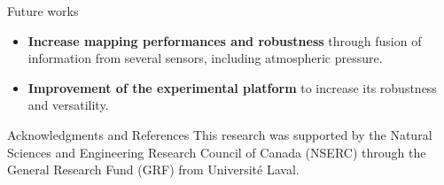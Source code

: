 \documentclass[final,hyperref={pdfpagelabels=false}]{beamer}
\begin{document}
\begin{frame}[t]
\begin{columns}[t]
\begin{column}{.465\textwidth}
\begin{block}{Future works}
	\begin{itemize}
		\item \textbf{Increase mapping performances and robustness} through fusion of information from several sensors, including atmospheric pressure.
		\item \textbf{Improvement of the experimental platform} to increase its robustness and versatility. 
	\end{itemize}
\end{block}


\begin{block}{Acknowledgments and References}
\footnotesize%
\noindent This research was supported by the Natural Sciences and Engineering Research Council of Canada (NSERC) through the General Research Fund (GRF) from Universit\'e Laval.
\nocite{*} %
%
{\footnotesize}
\vspace{-3mm}
\end{block}

%
%
%
%


\end{column} %


\end{columns}
\end{frame}
\end{document}
